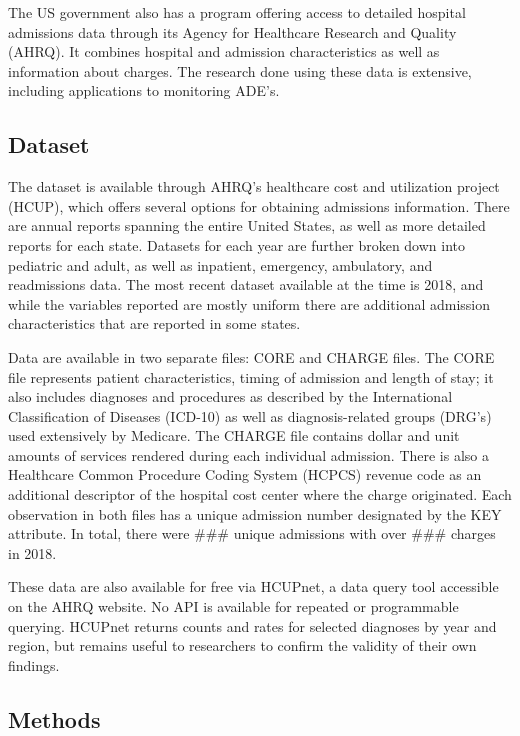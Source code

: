 \documentclass[preprint, 3p,
authoryear]{elsarticle} %
\begin{document}
The US government also has a program offering access to detailed
hospital admissions data through its Agency for Healthcare Research and
Quality (AHRQ). It combines hospital and admission characteristics as
well as information about charges. The research done using these data is
extensive, including applications to monitoring ADE's.

\hypertarget{dataset}{%
\subsection{Dataset}\label{dataset}}

The dataset is available through AHRQ's healthcare cost and utilization
project (HCUP), which offers several options for obtaining admissions
information. There are annual reports spanning the entire United States,
as well as more detailed reports for each state. Datasets for each year
are further broken down into pediatric and adult, as well as inpatient,
emergency, ambulatory, and readmissions data. The most recent dataset
available at the time is 2018, and while the variables reported are
mostly uniform there are additional admission characteristics that are
reported in some states.

Data are available in two separate files: CORE and CHARGE files. The
CORE file represents patient characteristics, timing of admission and
length of stay; it also includes diagnoses and procedures as described
by the International Classification of Diseases (ICD-10) as well as
diagnosis-related groups (DRG's) used extensively by Medicare. The
CHARGE file contains dollar and unit amounts of services rendered during
each individual admission. There is also a Healthcare Common Procedure
Coding System (HCPCS) revenue code as an additional descriptor of the
hospital cost center where the charge originated. Each observation in
both files has a unique admission number designated by the KEY
attribute. In total, there were \#\#\# unique admissions with over
\#\#\# charges in 2018.

These data are also available for free via HCUPnet, a data query tool
accessible on the AHRQ website. No API is available for repeated or
programmable querying. HCUPnet returns counts and rates for selected
diagnoses by year and region, but remains useful to researchers to
confirm the validity of their own findings.

\hypertarget{methods}{%
\subsection{Methods}\label{methods}}
\end{document}
